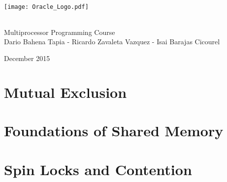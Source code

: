 \documentclass[letter,12pt]{report}
\begin{document}
\begin{titlepage}
\begin{center}

~\\[4 cm]

\texttt{[image: Oracle\_Logo.pdf]}

~\\[0.5 cm]

{\LARGE Multiprocessor Programming Course} \\[0.2 cm]

{Dario Bahena Tapia - Ricardo Zavaleta Vazquez - Isai Barajas Cicourel}

{\small December 2015}

\end{center}
\end{titlepage}

\tableofcontents

\chapter{Mutual Exclusion}






\chapter{Foundations of Shared Memory}









\chapter{Spin Locks and Contention}











\end{document}

